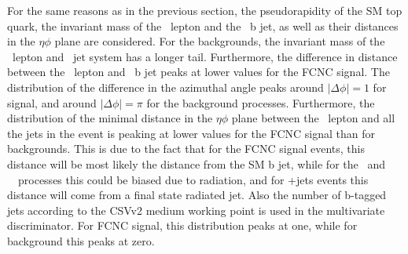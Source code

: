    For the same reasons as in the previous section, the pseudorapidity of the SM top quark,  the invariant mass of the \PW\ lepton and the \SM\ b jet, as well as their distances in the $\eta\phi$ plane are considered. For the backgrounds, the invariant mass of the \PW\ lepton and \SM\ jet system has a longer tail. Furthermore, the difference in distance  between the \PW\ lepton and \SM\ b jet peaks at lower values for the FCNC signal. The distribution of the difference in the azimuthal angle peaks around $|\Delta\phi|=1$ for signal, and around $|\Delta\phi|=\pi$ for the background processes. Furthermore, the distribution of the minimal distance in the $\eta\phi$ plane between the \PW\ lepton and all the jets in the event is peaking at lower values for the FCNC signal than for backgrounds. This is due to the fact that for the FCNC signal events, this distance will be most likely the distance from the SM b  jet, while for the \ttZ\ and \SM\ \tZq\ processes this could be biased due to radiation, and for \WZ+jets events this distance will come from a final state radiated jet.  Also the number of b-tagged jets according to the CSVv2 medium working point is used in the multivariate discriminator. For FCNC signal, this distribution peaks at one, while for background this peaks at zero.
   
